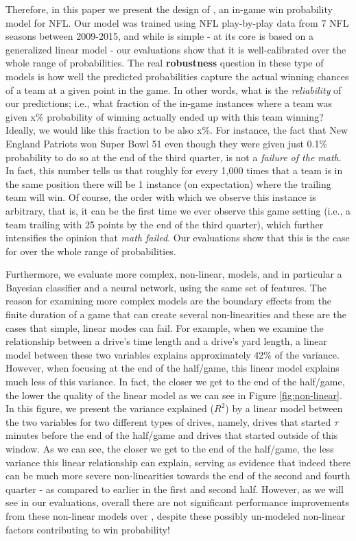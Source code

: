 \documentclass{sig-alternate}
\begin{document}
Therefore, in this paper we present the design of {\method}, an in-game win probability model for NFL.  %
Our model was trained using NFL play-by-play data from 7 NFL seasons between 2009-2015, and while {\method} is simple - at its core is based on a generalized linear model - our evaluations show that it is well-calibrated over the whole range of probabilities.  
The real {\bf robustness} question in these type of models is how well the predicted probabilities capture the actual winning chances of a team at a given point in the game.  
In other words, what is the {\em reliability} of our predictions; i.e., what fraction of the in-game instances where a team was given x\% probability of winning actually ended up with this team winning?  
Ideally, we would like this fraction to be also x\%.  
For instance, the fact that New England Patriots won Super Bowl 51 even though they were given just 0.1\% probability to do so at the end of the third quarter, is not a {\em failure of the math}.  
In fact, this number tells us that roughly for every 1,000 times that a team is in the same position there will be 1 instance (on expectation) where the trailing team will win.  
Of course, the order with which we observe this instance is arbitrary, that is, it can be the first time we ever observe this game setting (i.e., a team trailing with 25 points by the end of the third quarter), which further intensifies the opinion that {\em math failed}. 
Our evaluations show that this is the case for {\method} over the whole range of probabilities.  

Furthermore, we evaluate more complex, non-linear, models, and in particular a Bayesian classifier and a neural network, using the same set of features. 
The reason for examining more complex models are the boundary effects from the finite duration of a game that can create several non-linearities \cite{winston2012mathletics} and these are the cases that simple, linear modes can fail. 
For example, when we examine the relationship between a drive's time length and a drive's yard length, a linear model between these two variables explains approximately 42\% of the variance. 
However, when focusing at the end of the half/game, this linear model explains much less of this variance. 
In fact, the closer we get to the end of the half/game, the lower the quality of the linear model as we can see in Figure \ref{fig:non-linear}.  
In this figure, we present the variance explained ($R^2$) by a linear model between the two variables for two different types of drives, namely, drives that started $\tau$ minutes before the end of the half/game and drives that started outside of this window. 
As we can see, the closer we get to the end of the half/game, the less variance this linear relationship can explain, serving as evidence that indeed there can be much more severe non-linearities towards the end of the second and fourth quarter - as compared to earlier in the first and second half. 
However, as we will see in our evaluations, overall there are not significant performance improvements from these non-linear models over {\method}, despite these possibly un-modeled non-linear factors contributing to win probability! 
\end{document}
